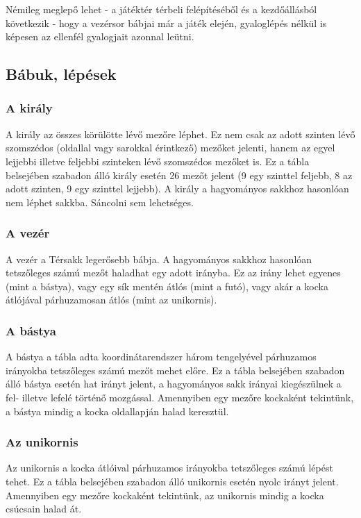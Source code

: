 \documentclass[12pt, twoside]{report}
\begin{document}
Némileg meglepő lehet - a játéktér térbeli felépítéséből és a kezdőállásból következik - hogy a vezérsor bábjai már a játék elején, gyaloglépés nélkül is képesen az ellenfél gyalogjait azonnal leütni.

\subsection{Bábuk, lépések}

\subsubsection{A király}

A király az összes körülötte lévő mezőre léphet. Ez nem csak az adott szinten lévő szomszédos (oldallal vagy sarokkal érintkező) mezőket jelenti, hanem az egyel lejjebbi illetve feljebbi szinteken lévő szomszédos mezőket is. Ez a tábla belsejében szabadon álló király esetén 26 mezőt jelent (9 egy szinttel feljebb, 8 az adott szinten, 9 egy szinttel lejjebb). A király a hagyományos sakkhoz hasonlóan nem léphet sakkba. Sáncolni sem lehetséges.

\subsubsection{A vezér}

A vezér a Térsakk legerősebb bábja. A hagyományos sakkhoz hasonlóan tetszőleges számú mezőt haladhat egy adott irányba. Ez az irány lehet egyenes (mint a bástya), vagy egy sík mentén átlós (mint a futó), vagy akár a kocka átlójával párhuzamosan átlós (mint az unikornis).

\subsubsection{A bástya}

A bástya a tábla adta koordinátarendszer három tengelyével párhuzamos irányokba tetszőleges számú mezőt mehet előre. Ez a tábla belsejében szabadon álló bástya esetén hat irányt jelent, a hagyományos sakk irányai kiegészülnek a fel- illetve lefelé történő mozgással. Amennyiben egy mezőre kockaként tekintünk, a bástya mindig a kocka oldallapján halad keresztül.

\subsubsection{Az unikornis}

Az unikornis a kocka átlóival párhuzamos irányokba tetszőleges számú lépést tehet. Ez a tábla belsejében szabadon álló unikornis esetén nyolc irányt jelent. Amennyiben egy mezőre kockaként tekintünk, az unikornis mindig a kocka csúcsain halad át.
\end{document}
